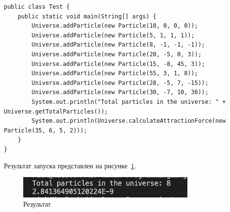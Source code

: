 \documentclass[a4paper, 14pt]{extarticle}
\begin{document}
\begin{lstlisting}[language={},caption={класс Test},label={lst:code3}]
public class Test {
    public static void main(String[] args) {
        Universe.addParticle(new Particle(10, 0, 0, 0));
        Universe.addParticle(new Particle(5, 1, 1, 1));
        Universe.addParticle(new Particle(8, -1, -1, -1));
        Universe.addParticle(new Particle(20, -5, 0, 3));
        Universe.addParticle(new Particle(15, -8, 45, 3));
        Universe.addParticle(new Particle(55, 3, 1, 8));
        Universe.addParticle(new Particle(28, -5, 7, -15));
        Universe.addParticle(new Particle(30, -7, 10, 36));
        System.out.println("Total particles in the universe: " + Universe.getTotalParticles());
        System.out.println(Universe.calculateAttractionForce(new Particle(35, 6, 5, 2)));
    }
}    
\end{lstlisting}

Результат запуска представлен на рисунке~\ref{fig:lab2a}.

\begin{figure}[!htb]
    \centering
    \includegraphics[width=0.8\textwidth]{lab2a}
    \caption{Результат}
    \label{fig:lab2a}
\end{figure}
\end{document}
